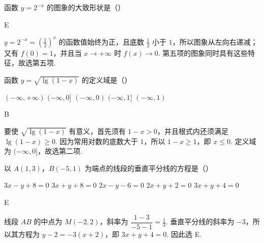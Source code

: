 \begin{problem}

函数 \(y = 2^{-x} \) 的图象的大致形状是（\quad）

\choicesfive
    {}
    {}
    {}
    {}
    {}
\begin{answer}
E
\end{answer}

\begin{solution}
\(y=2^{-x}=\left(\frac12\right)^x\) 的函数值始终为正，且底数 \(\frac12\) 小于 \(1\)，所以图象从左向右递减；又有 \(f(0)=1\)，并且当 \(x\to+\infty\) 时 \(f(x)\to0\). 第五项的图象同时具有这些特征，故选第五项.
\end{solution}
\end{problem}

\begin{problem}

函数 \(y = \sqrt{\lg(1 - x)} \) 的定义域是（\quad）

\choicesfive
    {\((-\infty,+\infty) \)}
    {\((-\infty, 0] \)}
    {\((-\infty, 0) \)}
    {\((-\infty, 1] \)}
    {\((-\infty, 1) \)}
\begin{answer}
B
\end{answer}

\begin{solution}
要使 \(\sqrt{\lg(1-x)}\) 有意义，首先须有 \(1-x>0\)，并且根式内还须满足 \(\lg(1-x)\geqslant0\). 因为常用对数的底数大于 \(1\)，所以 \(1-x\geqslant1\)，即 \(x\leqslant0\). 定义域为 \((-\infty,0]\)，故选第二项.
\end{solution}
\end{problem}

\begin{problem}

以 \(A(1, 3)\)，\(B(-5, 1)\) 为端点的线段的垂直平分线的方程是（\quad）

\choicesfive
    {\(3x - y + 8 = 0\)}
    {\(3x + y + 8 = 0\)}
    {\(2x - y - 6 = 0\)}
    {\(2x + y + 2 = 0\)}
    {\(3x + y + 4 = 0\)}
\begin{answer}
E
\end{answer}

\begin{solution}
线段 \(AB\) 的中点为 \(M\left(-2,2\right)\)，斜率为 \(\dfrac{1-3}{-5-1}=\frac13\). 垂直平分线的斜率为 \(-3\)，所以其方程为
\(y-2=-3(x+2)\)，即 \(3x+y+4=0\). 因此选 E.
\end{solution}
\end{problem}

